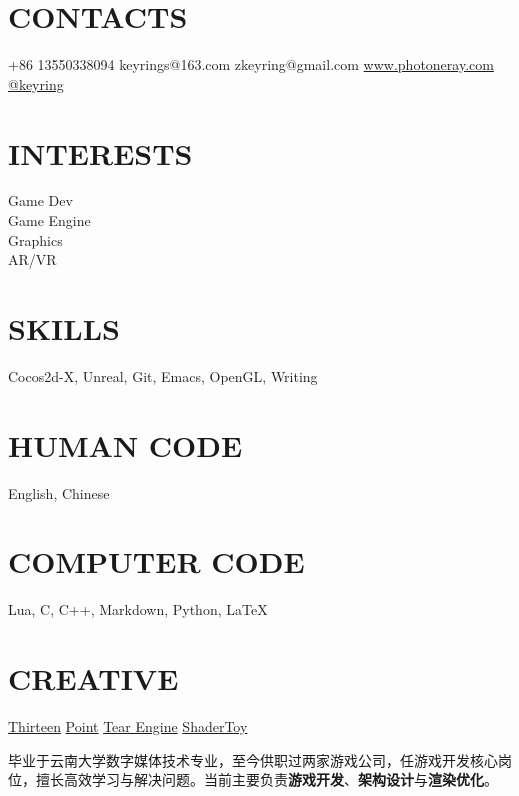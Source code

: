 \documentclass[full]{rvca}
\begin{document}


\begin{aside} %
\section{\uppercase{contacts}}
+86 13550338094 {\faMobile}
keyrings@163.com {\scriptsize\faLink}
zkeyring@gmail.com {\scriptsize\faLink}
\href{http://www.photoneray.com}{\color{sidebandtextcolor}www.photoneray.com \faGlobe} 
\href{https://github.com/keyring}{\color{sidebandtextcolor}@keyring \faGithub}
\ghost
\section{\uppercase{interests}}
Game Dev\\Game Engine\\Graphics\\AR/VR
%
\ghost
\section{\uppercase{skills}}
{\scriptsize\faHeart}Cocos2d-X, Unreal, Git, Emacs, OpenGL, Writing
\ghost 
\section{\uppercase{human code}}
English, Chinese
\ghost
\section{\uppercase{computer code}}
{\scriptsize\faHeart}Lua, {\scriptsize\faHeart}C, C++, {\scriptsize\faHeart}Markdown, Python, \LaTeX
\ghost
\section{\uppercase{creative}}
\href{http://a.app.qq.com/o/simple.jsp?pkgname=com.kode.Thirteen}{\color{sidebandtextcolor}Thirteen}
\href{https://github.com/keyring/point}{\color{sidebandtextcolor}Point}
\href{http://www.photoneray.com/Tear}{\color{sidebandtextcolor}Tear Engine}
\href{https://github.com/keyring/ShaderToy}{\color{sidebandtextcolor}ShaderToy}
\ghost
\end{aside}



\begin{statement}
毕业于云南大学数字媒体技术专业，至今供职过两家游戏公司，任游戏开发核心岗位，擅长高效学习与解决问题。当前主要负责\textbf{游戏开发}、\textbf{架构设计}与\textbf{渲染优化}。
\end{statement}
\end{document}
